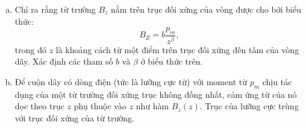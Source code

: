 \begin{vd}
\begin{enumerate}[1)]
\begin{center}
\end{center}
\begin{enumerate}[a)]
    \item Chỉ ra rằng từ trường $B_z$ nằm trên trục đối xứng của vòng được cho bởi biểu thức:
    \[B_{Z}=b \dfrac{p_{m}}{z^{\beta}},\]
    trong đó $z$ là khoảng cách từ một điểm trên trục đối xứng đến tâm của vòng dây. Xác định các tham số $b$ và $\beta$ ở biểu thức trên.
    \item Để cuộn dây có dòng điện (tức là lưỡng cực từ) với moment từ $p_m$ chịu tác dụng của một từ trường đối xứng trục không đồng nhất, cảm ứng từ của nó dọc theo trục $z$ phụ thuộc vào $z$ như hàm $B_{z}(z)$. Trục của lưỡng cực trùng với trục đối xứng của từ trường. 
    \begin{center}
         


\begin{tikzpicture}[x=0.75pt,y=0.75pt,yscale=-1,xscale=1]


\end{tikzpicture}
\end{center}
\end{enumerate}
\end{enumerate}
\end{vd}

